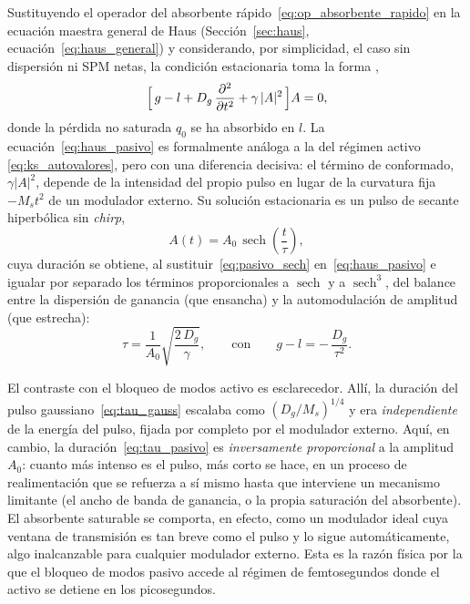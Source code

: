 Sustituyendo el operador del absorbente rápido~\eqref{eq:op_absorbente_rapido} en
la ecuación maestra general de Haus (Sección~\ref{sec:haus},
ecuación~\eqref{eq:haus_general}) y considerando, por simplicidad, el caso sin
dispersión ni SPM netas, la condición estacionaria toma la forma
\cite{Haus1975fast}, \cite[ecs.~6.20--6.27]{Kaertner2020}
%
\begin{equation}
    \Bigl[\,g - l + D_g\,\frac{\partial^2}{\partial t^2}
      + \gamma\,|A|^2 \,\Bigr] A = 0,
    \label{eq:haus_pasivo}
\end{equation}
%
donde la pérdida no saturada $q_0$ se ha absorbido en $l$. La
ecuación~\eqref{eq:haus_pasivo} es formalmente análoga a la del régimen activo
\eqref{eq:ks_autovalores}, pero con una diferencia decisiva: el término de
conformado, $\gamma|A|^2$, depende de la intensidad del propio pulso en lugar de la
curvatura fija $-M_s t^2$ de un modulador externo. Su solución estacionaria es un
pulso de secante hiperbólica sin \emph{chirp},
%
\begin{equation}
    A(t) = A_0\,\operatorname{sech}\!\left(\frac{t}{\tau}\right),
    \label{eq:pasivo_sech}
\end{equation}
%
cuya duración se obtiene, al sustituir~\eqref{eq:pasivo_sech}
en~\eqref{eq:haus_pasivo} e igualar por separado los términos proporcionales a
$\operatorname{sech}$ y a $\operatorname{sech}^3$, del balance entre la dispersión
de ganancia (que ensancha) y la automodulación de amplitud (que estrecha):
%
\begin{equation}
    \tau = \frac{1}{A_0}\sqrt{\frac{2\,D_g}{\gamma}},
    \qquad\text{con}\qquad
    g - l = -\,\frac{D_g}{\tau^2}.
    \label{eq:tau_pasivo}
\end{equation}

El contraste con el bloqueo de modos activo es esclarecedor. Allí, la duración del
pulso gaussiano~\eqref{eq:tau_gauss} escalaba como $(D_g/M_s)^{1/4}$ y era
\emph{independiente} de la energía del pulso, fijada por completo por el modulador
externo. Aquí, en cambio, la duración~\eqref{eq:tau_pasivo} es
\emph{inversamente proporcional} a la amplitud $A_0$: cuanto más intenso es el
pulso, más corto se hace, en un proceso de realimentación que se refuerza a sí
mismo hasta que interviene un mecanismo limitante (el ancho de banda de ganancia, o
la propia saturación del absorbente). El absorbente saturable se comporta, en
efecto, como un modulador ideal cuya ventana de transmisión es tan breve como el
pulso y lo sigue automáticamente, algo inalcanzable para cualquier modulador
externo. Esta es la razón física por la que el bloqueo de modos pasivo accede al
régimen de femtosegundos donde el activo se detiene en los picosegundos.

